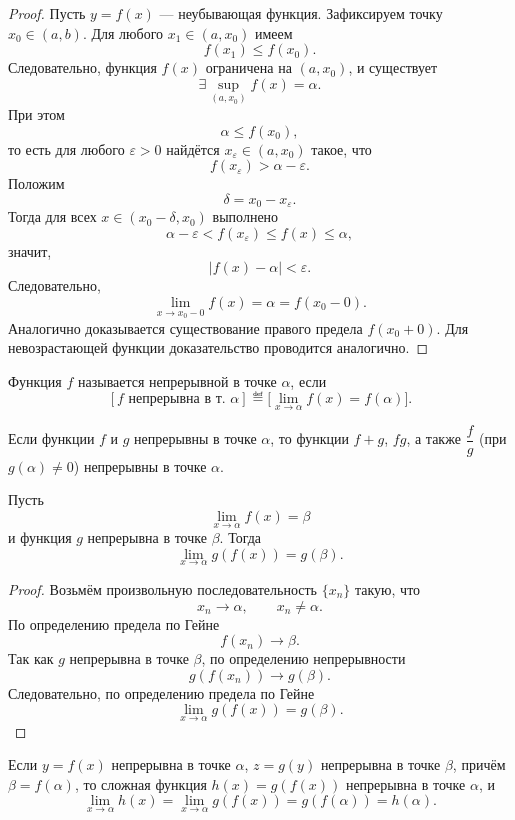\begin{proof}
Пусть \(y=f(x)\) --- неубывающая функция. Зафиксируем точку \(x_0\in(a,b)\).
Для любого \(x_1\in(a,x_0)\) имеем
\[
f(x_1)\le f(x_0).
\]
Следовательно, функция \(f(x)\) ограничена на \((a,x_0)\), и существует
\[
\exists \sup_{(a,x_0)} f(x)=\alpha.
\]
При этом
\[
\alpha\le f(x_0),
\]
то есть для любого \(\varepsilon>0\) найдётся \(x_\varepsilon\in(a,x_0)\) такое,
что
\[
f(x_\varepsilon)>\alpha-\varepsilon.
\]
Положим
\[
\delta=x_0-x_\varepsilon.
\]
Тогда для всех \(x\in(x_0-\delta,x_0)\) выполнено
\[
\alpha-\varepsilon<f(x_\varepsilon)\le f(x)\le\alpha,
\]
значит,
\[
|f(x)-\alpha|<\varepsilon.
\]
Следовательно,
\[
\lim_{x\to x_0-0} f(x)=\alpha=f(x_0-0).
\]
Аналогично доказывается существование правого предела \(f(x_0+0)\).
Для невозрастающей функции доказательство проводится аналогично.
\end{proof}


\begin{definition}
Функция \(f\) называется непрерывной в точке \(\alpha\), если
\[
[f \text{ непрерывна в т. } \alpha]
\eqdef
\bigl[\lim_{x\to\alpha} f(x)=f(\alpha)\bigr].
\]
\end{definition}

\begin{theorem}
Если функции \(f\) и \(g\) непрерывны в точке \(\alpha\), то функции
\(f+g\), \(fg\), а также \(\dfrac{f}{g}\) (при \(g(\alpha)\ne 0\)) непрерывны
в точке \(\alpha\).
\end{theorem}

\begin{theorem}
Пусть
\[
\lim_{x\to\alpha} f(x)=\beta
\]
и функция \(g\) непрерывна в точке \(\beta\). Тогда
\[
\lim_{x\to\alpha} g(f(x))=g(\beta).
\]
\end{theorem}

\begin{proof}
Возьмём произвольную последовательность \(\{x_n\}\) такую, что
\[
x_n\to\alpha,\qquad x_n\ne\alpha.
\]
По определению предела по Гейне
\[
f(x_n)\to\beta.
\]
Так как \(g\) непрерывна в точке \(\beta\), по определению непрерывности
\[
g(f(x_n))\to g(\beta).
\]
Следовательно, по определению предела по Гейне
\[
\lim_{x\to\alpha} g(f(x))=g(\beta).
\]
\end{proof}

\begin{corollary}
Если \(y=f(x)\) непрерывна в точке \(\alpha\), \(z=g(y)\) непрерывна
в точке \(\beta\), причём \(\beta=f(\alpha)\), то сложная функция
\(h(x)=g(f(x))\) непрерывна в точке \(\alpha\), и
\[
\lim_{x\to\alpha} h(x)
=
\lim_{x\to\alpha} g(f(x))
=
g(f(\alpha))
=
h(\alpha).
\]
\end{corollary}

